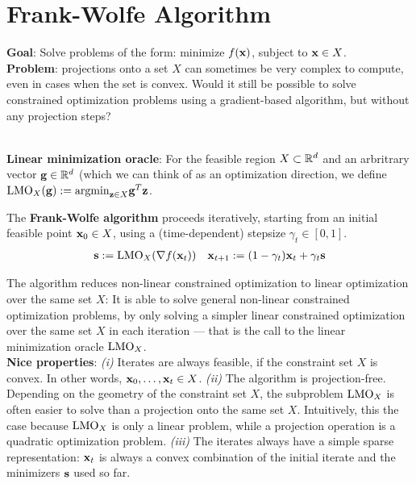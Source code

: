\section{Frank-Wolfe Algorithm}
\textbf{Goal}: Solve problems of the form: minimize $f(\mathbf{x})$, subject to $\mathbf{x} \in X$. \\
\textbf{Problem}: projections onto a set $X$ can sometimes be very complex to compute, even in cases when the set is convex. Would it still be possible to solve constrained optimization problems using a gradient-based algorithm, but without any projection steps? \\
 \\
\begin{framed}
    \textbf{Linear minimization oracle}: For the feasible region $X \subset \mathbb{R}^d$ and an arbritrary vector $\mathbf{g} \in \mathbb{R}^d$ (which we can think of as an optimization direction, we define $\mathrm{LMO}_X(\mathbf{g}) := \mathrm{argmin}_{\mathbf{z} \in X}{\mathbf{g}^T \mathbf{z}}$.
\end{framed}
\begin{framed}
    The \textbf{Frank-Wolfe algorithm} proceeds iteratively, starting from an initial feasible point $\mathbf{x}_0 \in X$, using a (time-dependent) stepsize $\gamma_t \in [0, 1]$.
    \begin{align*}
        \mathbf{s} := \mathrm{LMO}_X(\nabla f(\mathbf{x}_t)) && \mathbf{x}_{t+1} := (1 - \gamma_t)\mathbf{x}_t + \gamma_t \mathbf{s}
    \end{align*}
\end{framed}
The algorithm reduces non-linear constrained optimization to linear optimization over the same set $X$: It is able to solve general non-linear constrained optimization problems, by only solving a simpler linear constrained optimization over the same set $X$ in each iteration — that is the call to the linear minimization oracle $\mathrm{LMO}_X$. \\
\textbf{Nice properties}: \textit{(i)} Iterates are always feasible, if the constraint set $X$ is convex. In other words, $\mathbf{x}_0, \dots, \mathbf{x}_t \in X$. \textit{(ii)} The algorithm is projection-free. Depending on the geometry of the constraint set $X$, the subproblem $\mathrm{LMO}_X$ is often easier to solve than a projection onto the same set $X$. Intuitively, this the case because $\mathrm{LMO}_X$ is only a linear problem, while a projection operation is a quadratic optimization problem. \textit{(iii)} The iterates always have a simple sparse representation: $\mathbf{x}_t$ is always a convex combination of the initial iterate and the minimizers $\mathbf{s}$ used so far. \\
